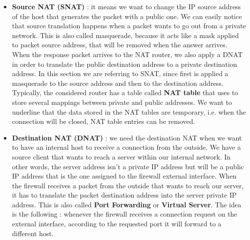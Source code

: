 \documentclass[11pt]{article}
\begin{document}
\begin{itemize}
\item \textbf{Source NAT (SNAT)} : it means we want to change the IP source address of the host that generates the packet with a public one. We can easily notice that source translation happens when a packet wants to go out from a private network. This is also called masquerade, because it acts like a mask applied to packet source address, that will be removed when the answer arrives. When the response packet arrives to the NAT router, we also apply a DNAT in order to translate the public destination address to a private destination address. In this section we are referring to SNAT, since first is applied a masquerade to the source address and then to the destination address. Typically, the considered router has a table called \textbf{NAT table} that uses to store several mappings between private and public addresses. We want to underline that the data stored in the NAT tables are temporary, i.e. when the connection will be closed, NAT table entries can be removed. 
\item \textbf{Destination NAT (DNAT)} : we need the destination NAT when we want to have an internal host to receive a connection from the outside. We have a source client that wants to reach a server within our internal network. In other words, the server address isn't a private IP address but will be a public IP address that is the one assigned to the firewall external interface. When the firewall receives a packet from the outside that wants to reach our server, it has to translate the packet destination address into the server private IP address. This is also called \textbf{Port Forwarding} or \textbf{Virtual Server}. The idea is the following : whenever the firewall receives a connection request on the external interface, according to the requested port it will forward to a different host.
\end{itemize}
\end{document}
